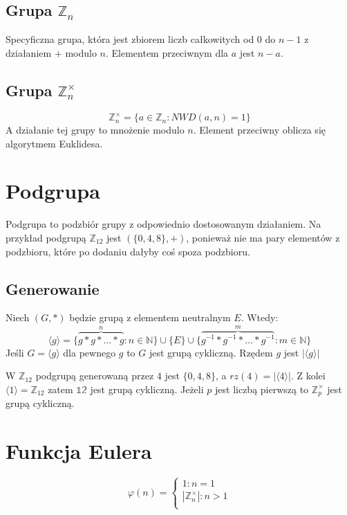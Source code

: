\documentclass{../notatki}
\begin{document}
\subsection{\texorpdfstring{Grupa $\mathbb{Z}_n$}{Grupa Zn}}

Specyficzna grupa, która jest zbiorem liczb całkowitych od $0$ do $n-1$ z
działaniem $+$ modulo $n$. Elementem przeciwnym dla $a$ jest $n - a$.

\subsection{\texorpdfstring{Grupa $\mathbb{Z}_n^\times$}{Grupa Znx}}

$$
\mathbb{Z}_n^\times = \{a \in \mathbb{Z}_n : NWD(a,n) = 1\}
$$
A działanie tej grupy to mnożenie modulo $n$. Element przeciwny oblicza się
algorytmem Euklidesa.

\section{Podgrupa}

Podgrupa to podzbiór grupy z odpowiednio dostosowanym działaniem. Na przykład
podgrupą $\mathbb{Z}_{12}$ jest $(\{0, 4, 8\}, +)$, ponieważ nie
ma pary elementów z
podzbioru, które po dodaniu dałyby coś spoza podzbioru.

\subsection{Generowanie}

Niech $(G, *)$ będzie grupą z elementem neutralnym $E$. Wtedy:
$$
\langle g \rangle = \{\stackrel{n}{\overbrace{g * g * \dots * g}} : n
\in \mathbb{N}\} \cup \{E\} \cup \{\stackrel{m}{\overbrace{g^{-1} * g^{-1} *
  \dots * g^{-1}}} : m
\in \mathbb{N}\}
$$
Jeśli $G = \langle g \rangle$ dla pewnego $g$ to $G$ jest grupą
cykliczną. Rzędem
$g$ jest $|\langle g \rangle|$

W $\mathbb{Z}_{12}$ podgrupą generowaną przez $4$ jest $\{0, 4, 8\}$, a
$rz(4) = |\langle 4 \rangle|$. Z kolei $\langle 1 \rangle = \mathbb{Z}_{12}$
zatem $\mathbb{12}$ jest grupą cykliczną. Jeżeli $p$ jest liczbą pierwszą
to $\mathbb{Z}_p^\times$ jest grupą cykliczną.

\section{Funkcja Eulera}

$$
\varphi(n) =
\begin{cases}
  1 : n = 1\\
  |\mathbb{Z}_n^\times| : n > 1\\
\end{cases}
$$
\end{document}
